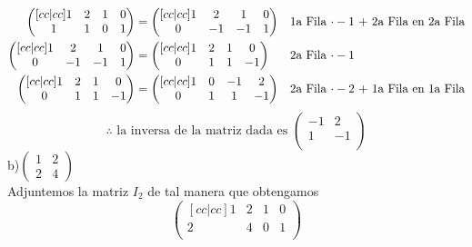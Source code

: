 \documentclass[letterpaper]{article}
\renewcommand{\*}{\cdot}
\theoremstyle{definition}
\begin{document}
	\begin{align*}
		\begin{pmatrix}[cc|cc]
		1 & 2 & 1 & 0 \\
		1 & 1 & 0 & 1 \\
		\end{pmatrix} & = \begin{pmatrix}[cc|cc]
		1 & 2 & 1 & 0 \\
		0 & -1 & -1 & 1 \\
		\end{pmatrix} && \text{1a Fila $ \* -1 $ + 2a Fila en 2a Fila}\\
		\begin{pmatrix}[cc|cc]
		1 & 2 & 1 & 0 \\
		0 & -1 & -1 & 1 \\
		\end{pmatrix} &= \begin{pmatrix}[cc|cc]
		1 & 2 & 1 & 0 \\
		0 & 1 & 1 & -1 \\
		\end{pmatrix} && \text{2a Fila $ \* -1$ }\\
		\begin{pmatrix}[cc|cc]
		1 & 2 & 1 & 0 \\
		0 & 1 & 1 & -1 \\
		\end{pmatrix} & = \begin{pmatrix}[cc|cc]
		1 & 0 & -1 & 2 \\
		0 & 1 & 1 & -1 \\
		\end{pmatrix} && \text{2a Fila $ \* -2 $ + 1a Fila en 1a Fila}
	\end{align*}
	\[ \therefore \text{ la inversa de la matriz dada es }  \begin{pmatrix}
	-1 & 2 \\
	1 & -1 \\
	\end{pmatrix} \]
	b)$\begin{pmatrix} 1 & 2 \\ 2 & 4 \end{pmatrix}$ \\
	Adjuntemos la matriz $ I_2 $ de tal manera que obtengamos
	\[\begin{pmatrix}[cc|cc]
	1 & 2 & 1 & 0 \\
	2 & 4 & 0 & 1 \\
	\end{pmatrix}\]
\end{document}
